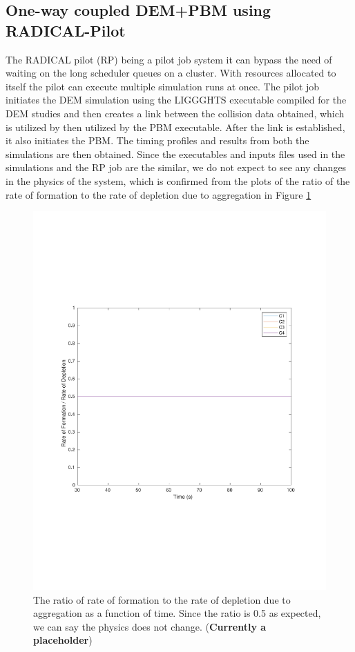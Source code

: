 \documentclass[preprint,11pt,authoryear]{elsarticle}
\begin{document}
\subsection{One-way coupled DEM+PBM using RADICAL-Pilot} 
 The RADICAL pilot (RP) being a pilot job system it can bypass the need of waiting on the long scheduler
queues on a cluster. With resources allocated to itself the pilot can execute multiple simulation runs 
at once. The pilot job initiates the DEM simulation using the LIGGGHTS executable compiled for the DEM
studies and then creates a link between the collision data obtained, which is utilized by then utilized 
by the PBM executable. After the link is established, it also initiates the PBM. The timing profiles and
results from both the simulations are then obtained. Since the executables and inputs files used in the 
simulations and the RP job are the similar, we do not expect to see any changes in the physics of the 
system, which is confirmed from the plots of the ratio of the rate of formation to the rate of depletion 
due to aggregation in Figure \ref{fig:rslts_RP_ratio_plot}
\begin{figure}[H]
\centering
\includegraphics[scale=0.5]{rslts_PBM_2mm_validation.pdf}
\caption{The ratio of rate of formation to the rate of depletion due to aggregation 
as a function of time. Since the ratio is 0.5 as expected, we can say the physics does not change. 
(\textbf{Currently a placeholder})}
\label{fig:rslts_RP_ratio_plot}
\end{figure}
\end{document}

